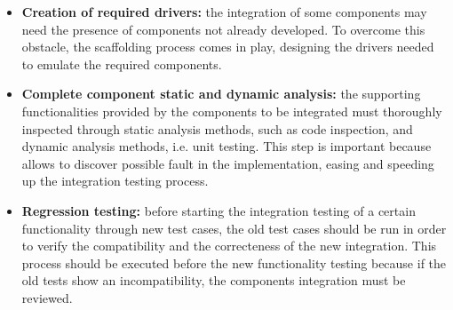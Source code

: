 \begin{itemize}
	\item \textbf{Creation of required drivers:} the integration of some components may need the presence of components not already developed. To overcome this obstacle, the scaffolding process comes in play, designing the drivers needed to emulate the required components. 
	\item \textbf{Complete component static and dynamic analysis:} the supporting functionalities provided by the components to be integrated must thoroughly inspected through static analysis methods, such as code inspection, and dynamic analysis methods, i.e. unit testing. This step is important because allows to discover possible fault in the implementation, easing and speeding up the integration testing process.
	\item \textbf{Regression testing:} before starting the integration testing of a certain functionality through new test cases, the old test cases should be run in order to verify the compatibility and the correcteness of the new integration. This process should be executed before the new functionality testing because if the old tests show an incompatibility, the components integration must be reviewed.
\end{itemize}
